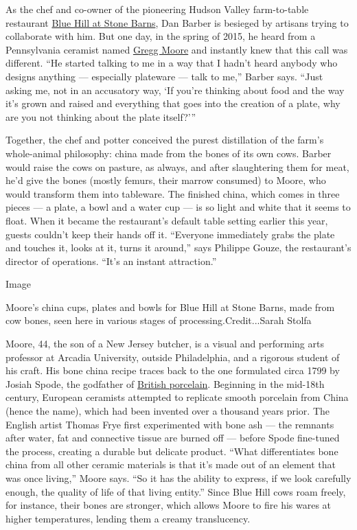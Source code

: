 As the chef and co-owner of the pioneering Hudson Valley farm-to-table
restaurant
\href{https://www.nytimes3xbfgragh.onion/2015/05/11/t-magazine/blue-hill-stone-barns-sothebys-gallery.html}{Blue
Hill at Stone Barns}, Dan Barber is besieged by artisans trying to
collaborate with him. But one day, in the spring of 2015, he heard from
a Pennsylvania ceramist named \href{http://www.greggfmoore.com/}{Gregg
Moore} and instantly knew that this call was different. ``He started
talking to me in a way that I hadn't heard anybody who designs anything
--- especially plateware --- talk to me,'' Barber says. ``Just asking
me, not in an accusatory way, `If you're thinking about food and the way
it's grown and raised and everything that goes into the creation of a
plate, why are you not thinking about the plate itself?'''

Together, the chef and potter conceived the purest distillation of the
farm's whole-animal philosophy: china made from the bones of its own
cows. Barber would raise the cows on pasture, as always, and after
slaughtering them for meat, he'd give the bones (mostly femurs, their
marrow consumed) to Moore, who would transform them into tableware. The
finished china, which comes in three pieces --- a plate, a bowl and a
water cup --- is so light and white that it seems to float. When it
became the restaurant's default table setting earlier this year, guests
couldn't keep their hands off it. ``Everyone immediately grabs the plate
and touches it, looks at it, turns it around,'' says Philippe Gouze, the
restaurant's director of operations. ``It's an instant attraction.''

Image

Moore's china cups, plates and bowls for Blue Hill at Stone Barns, made
from cow bones, seen here in various stages of processing.Credit...Sarah
Stolfa

Moore, 44, the son of a New Jersey butcher, is a visual and performing
arts professor at Arcadia University, outside Philadelphia, and a
rigorous student of his craft. His bone china recipe traces back to the
one formulated circa 1799 by Josiah Spode, the godfather of
\href{https://www.nytimes3xbfgragh.onion/1992/02/16/travel/in-the-cradle-of-english-china.html}{British
porcelain}. Beginning in the mid-18th century, European ceramists
attempted to replicate smooth porcelain from China (hence the name),
which had been invented over a thousand years prior. The English artist
Thomas Frye first experimented with bone ash --- the remnants after
water, fat and connective tissue are burned off --- before Spode
fine-tuned the process, creating a durable but delicate product. ``What
differentiates bone china from all other ceramic materials is that it's
made out of an element that was once living,'' Moore says. ``So it has
the ability to express, if we look carefully enough, the quality of life
of that living entity.'' Since Blue Hill cows roam freely, for instance,
their bones are stronger, which allows Moore to fire his wares at higher
temperatures, lending them a creamy translucency.

